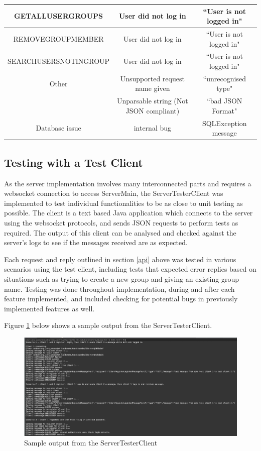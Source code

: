 \begin{table}[H]
\begin{tabular}{ |c |c|c| }
  \hline
  GETALLUSERGROUPS& User did not log in & ``User is not logged in" \\
 \hline
 REMOVEGROUPMEMBER  & User did not log in & ``User is not logged in"  \\
  \hline
  SEARCHUSERSNOTINGROUP& User did not log in & ``User is not logged in" \\
 \hline
 Other &  Unsupported request name given & ``unrecognised type"  \\ 
 & Unparsable string (Not JSON compliant) & ``bad JSON Format"\\ \hline
 Database issue & internal bug & SQLException message\\ 
  \hline
\end{tabular}
\end{table}


\subsection{Testing with a Test Client}

As the server implementation involves many interconnected parts and requires a websocket connection to access ServerMain, the ServerTesterClient was implemented to test individual functionalities to be as close to unit testing as possible. The client is a text based Java application which connects to the server using the websocket protocols, and sends JSON requests to perform tests as required. The output of this client can be analysed and checked against the server's logs to see if the messages received are as expected. 

Each request and reply outlined in section \ref{api} above was tested in various scenarios using the test client, including tests that expected error replies based on situations such as trying to create a new group and giving an existing group name. Testing was done throughout implementation, during and after each feature implemented, and included checking for potential bugs in previously implemented features as well. 

Figure \ref{clientTest} below shows a sample output from the ServerTesterClient.


\begin{figure}[H]
  \includegraphics[width=\linewidth]{images/clientTest.png}
  \caption{Sample output from the ServerTesterClient}
  \label{clientTest}
\end{figure}
